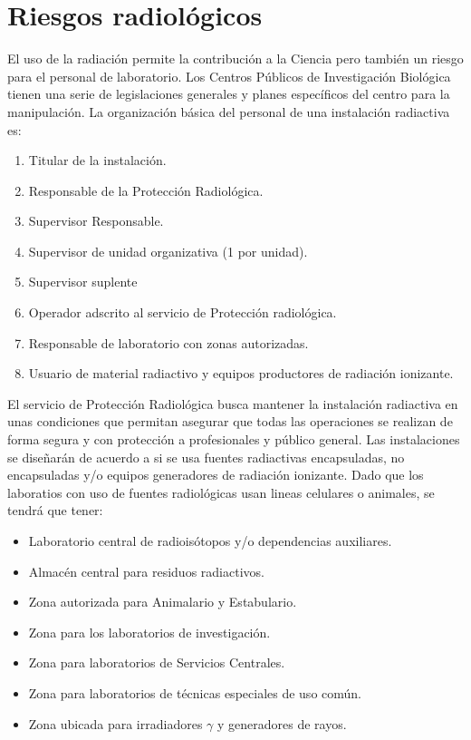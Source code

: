 \section{Riesgos radiológicos}
El uso de la radiación permite la contribución a la Ciencia pero también un riesgo para el personal de laboratorio. Los Centros Públicos de Investigación Biológica tienen una serie de legislaciones generales y planes específicos del centro para la manipulación. La organización básica del personal de una instalación radiactiva es:
\begin{enumerate}[itemsep=0pt,parsep=0pt,topsep=0pt,partopsep=0pt]
    \item Titular de la instalación.
    \item Responsable de la Protección Radiológica.
    \item Supervisor Responsable.
    \item Supervisor de unidad organizativa (1 por unidad).
    \item Supervisor suplente
    \item Operador adscrito al servicio de Protección radiológica.
    \item Responsable de laboratorio con zonas autorizadas.
    \item Usuario de material radiactivo y equipos productores de radiación ionizante.
\end{enumerate}

El servicio de Protección Radiológica busca mantener la instalación radiactiva en unas condiciones que permitan asegurar que todas las operaciones se realizan de forma segura y con protección a profesionales y público general. Las instalaciones se diseñarán de acuerdo a si se usa fuentes radiactivas encapsuladas, no encapsuladas y/o equipos generadores de radiación ionizante. Dado que los laboratios con uso de fuentes radiológicas usan lineas celulares o animales, se tendrá que tener:
\begin{itemize}[itemsep=0pt,parsep=0pt,topsep=0pt,partopsep=0pt]
    \item Laboratorio central de radioisótopos y/o dependencias auxiliares.
    \item Almacén central para residuos radiactivos.
    \item Zona autorizada para Animalario y Estabulario.
    \item Zona para los laboratorios de investigación.
    \item Zona para laboratorios de Servicios Centrales.
    \item Zona para laboratorios de técnicas especiales de uso común.
    \item Zona ubicada para irradiadores $\gamma$ y generadores de rayos.
\end{itemize}

